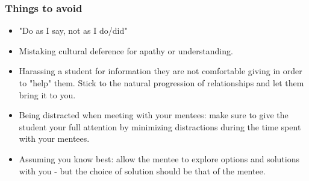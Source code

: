 \documentclass[titlepage]{article}
\begin{document}
\subsubsection{Things to avoid}
\label{sec:orgc1ae3e0}
\begin{itemize}
\item "Do as I say, not as I do/did"
\item Mistaking cultural deference for apathy or understanding.
\item Harassing a student for information they are not comfortable giving in order to "help" them. Stick to the natural progression of relationships and let them bring it to you.
\item Being distracted when meeting with your mentees: make sure to give the student your full attention by minimizing distractions during the time spent with your mentees.
\item Assuming you know best: allow the mentee to explore options and solutions with you - but the choice of solution should be that of the mentee.
\end{itemize}
\end{document}
